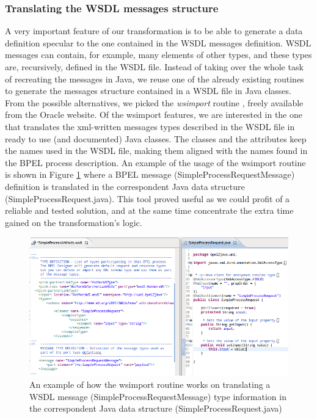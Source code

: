 \subsubsection{Translating the WSDL messages structure}
\label{sec:WSDLMEssagesStructure}
A very important feature of our transformation is to be able to generate a data definition specular to the one contained in the WSDL messages definition. WSDL messages can contain, for example, many elements of other types, and these types are, recursively, defined in the WSDL file. 
Instead of taking over the whole task of recreating the messages in Java, we reuse one of the already existing routines to generate the messages structure contained in a WSDL file in Java classes. From the possible alternatives, we picked the \textit{wsimport} routine \cite{wsimport}, freely available from the Oracle website. Of the wsimport features, we are interested in the one that translates the xml-written messages types described in the WSDL file in ready to use (and documented) Java classes. The classes and the attributes keep the names used in the WSDL file, making them aligned with the names found in the BPEL process description. 
An example of the usage of the wsimport routine is shown in Figure \ref{fig:wsimport} where a BPEL message (SimpleProcessRequestMessage) definition is translated in the correspondent Java data structure (SimpleProcessRequest.java).
This tool proved useful as we could profit of a reliable and tested solution, and at the same time concentrate the extra time gained on the transformation's logic. 

\begin{figure}
  \begin{center}
    \includegraphics[scale=0.57]{pictures/wsImport.png}
    \caption{An example of how the wsimport routine works on translating a WSDL message (SimpleProcessRequestMessage) type information in the correspondent Java data structure (SimpleProcessRequest.java)}
    \label{fig:wsimport}
  \end{center}
\end{figure} 

